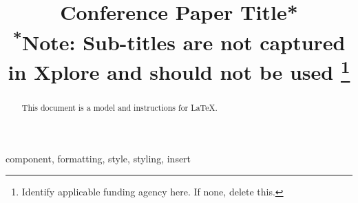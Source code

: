 \documentclass[10pt,conference,letterpaper]{IEEEtran}
\begin{document}
    \title{Conference Paper Title*\\
    {\footnotesize \textsuperscript{*}Note: Sub-titles are not captured in Xplore and
    should not be used}
    \thanks{Identify applicable funding agency here. If none, delete this.}
    }

    \author{
    }

    \maketitle

    \begin{abstract}
        This document is a model and instructions for \LaTeX.
    \end{abstract}

    \begin{IEEEkeywords}
        component, formatting, style, styling, insert
    \end{IEEEkeywords}


    
    
    
    
    
    
    

%    


    
    
\end{document}
